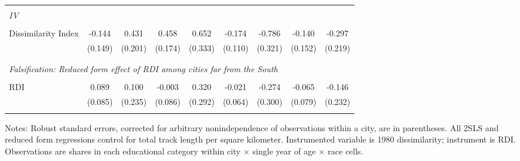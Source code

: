 \begin{table}[H]
{\begin{threeparttable}
\begin{tabular}{lcccccccc}
\smallskip \\
 \multicolumn{8}{l}{\emph{IV}} & \\
\smallskip \\
Dissimilarity Index &      -0.144         &       0.431\sym{**} &       0.458\sym{**} &       0.652\sym{*}  &      -0.174         &      -0.786\sym{**} &      -0.140         &      -0.297         \\
                    &     (0.149)         &     (0.201)         &     (0.174)         &     (0.333)         &     (0.110)         &     (0.321)         &     (0.152)         &     (0.219)         \\
\smallskip \\
\smallskip \\
 \multicolumn{8}{l}{\emph{Falsification: Reduced form effect of RDI among cities far from the South}} & \\
\smallskip \\
RDI                 &       0.089         &       0.100         &      -0.003         &       0.320         &      -0.021         &      -0.274         &      -0.065         &      -0.146         \\
                    &     (0.085)         &     (0.235)         &     (0.086)         &     (0.292)         &     (0.064)         &     (0.300)         &     (0.079)         &     (0.232)         \\
\bottomrule[0.5pt]                                                                               \label{tab:table2}                                                                       \end{tabular}                                                                                                    \vspace{-13pt}                                                                                           \begin{tablenotes}[flushleft]{\setlength{\itemindent}{-3pt}}          \small                                                                                                           \item Notes: Robust standard errors, corrected for arbitrary nonindependence of observations within a city, are in parentheses. All 2SLS and reduced form regressions control for total track length per square kilometer. Instrumented variable is 1980 dissimilarity; instrument is RDI. Observations are shares in each educational category within city × single year of age × race cells.           \end{tablenotes}                                                                                         \end{threeparttable}                                                                             }                                                                                                                        \end{table}
